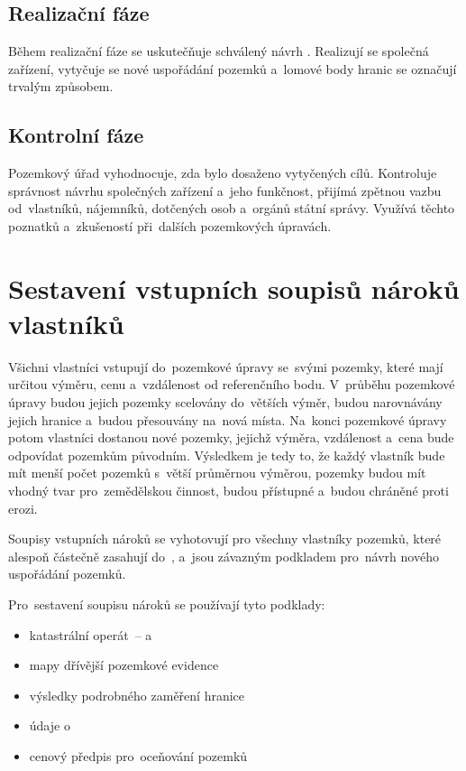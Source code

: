 \subsection{Realizační fáze}
\label{realizacni_faze}

Během realizační fáze se uskutečňuje schválený návrh
. Realizují se společná zařízení, vytyčuje se nové uspořádání
pozemků a~lomové body hranic se označují trvalým způsobem.

\subsection{Kontrolní fáze}
\label{kontrolni_faze}

Pozemkový úřad vyhodnocuje, zda bylo dosaženo vytyčených
cílů. Kontroluje správ\-nost návrhu společných zařízení a~jeho
funkčnost, přijímá zpětnou vazbu od~vlastníků, nájemníků, dotčených
osob a~orgánů státní správy. Využívá těchto poznatků a~zkušeností
při~dalších pozemkových úpravách.

\section{Sestavení vstupních soupisů nároků vlastníků}
\label{naroky}

Všichni vlastníci vstupují do~pozemkové úpravy se~svými pozemky, které
mají určitou výměru, cenu a~vzdálenost od referenčního bodu.
V~průběhu pozemkové úpravy budou jejich pozemky scelovány do~větších
výměr, budou narovnávány jejich hra\-nice a~budou přesouvány na~nová místa.
Na~konci pozemkové úpravy potom vlastníci dostanou nové pozemky, jejichž výměra,
vzdálenost a~cena bude odpovídat pozemkům původním. Výsledkem je tedy
to, že každý vlastník bude mít menší počet pozemků s~větší průměrnou
výměrou, pozemky budou mít vhodný tvar pro~zemědělskou činnost, budou
přístupné a~budou chráněné proti erozi.

Soupisy vstupních nároků se vyhotovují pro všechny vlastníky pozemků,
které alespoň částečně zasahují do~, a~jsou závazným
podkladem pro~návrh nového uspořádání pozemků.

Pro~sestavení soupisu nároků se používají tyto podklady:
\vspace{-\topsep}
	\begin{itemize}[leftmargin=1.5cm, noitemsep]
		\item katastrální operát~–  a~
		\item mapy dřívější pozemkové evidence
		\item výsledky podrobného zaměření hranice 
		\item údaje o~
		\item cenový předpis pro~oceňování pozemků
	\end{itemize}

